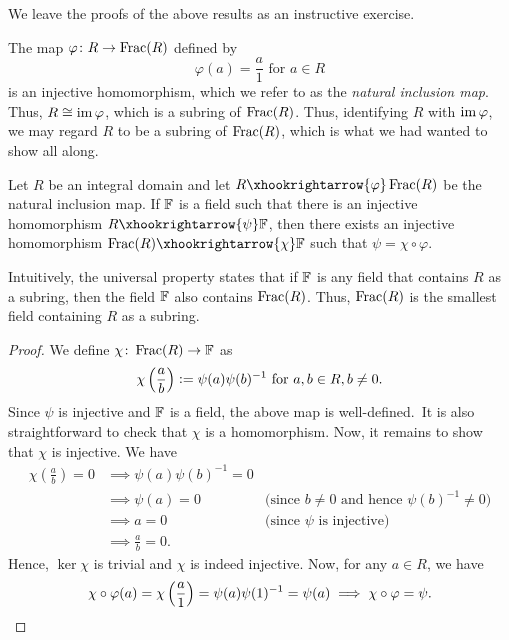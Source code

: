 We leave the proofs of the above results as an instructive exercise.

The map $\varphi \colon R \to \operatorname{Frac}(R)$ defined by
\[
    \varphi(a) = \frac{a}{1} \text{ for } a \in R
\]
is an injective homomorphism, which we refer to as the \emph{natural inclusion map}. Thus, $R \cong \operatorname{im}\varphi$, which is a subring of $\operatorname{Frac}(R)$. Thus, identifying $R$ with $\operatorname{im}\varphi$, we may regard $R$ to be a subring of $\operatorname{Frac}(R)$, which is what we had wanted to show all along.

\begin{theorem} \label{thm:universal-property} Let $R$ be an       integral domain and let $R \xhookrightarrow{\varphi} \fr(R)$ be the natural inclusion map. If $\mathbb{F}$ is a field such that there is an injective homomorphism $R \xhookrightarrow{\psi} \F$, then there exists an injective homomorphism $\fr(R) \xhookrightarrow{\chi} \F$ such that $\psi = \chi \circ \varphi$.
\end{theorem}


Intuitively, the universal property states that if $\mathbb{F}$ is any field that contains $R$ as a subring, then the field $\mathbb{F}$ also contains $\operatorname{Frac}(R)$. Thus, $\operatorname{Frac}(R)$ is the smallest field containing $R$ as a subring.

\begin{proof}
    We define $\chi \colon \operatorname{Frac}(R) \to \mathbb{F}$ as 
    \[
        \chi\left( \frac{a}{b} \right) \vcentcolon= \psi(a) \psi(b)^{-1} \text{ for } a,b \in R, b \neq 0.
    \]
    Since $\psi$ is injective and $\mathbb{F}$ is a field, the above map is well-defined.\footnotemark\ It is also straightforward to check that $\chi$ is a homomorphism. Now, it remains to show that $\chi$ is injective. We have
    \begin{align*}
        \chi\left( \frac{a}{b} \right) = 0 &\implies \psi(a)\psi(b)^{-1} = 0 \\
        &\implies \psi(a) = 0 &\text{(since $b \neq 0$ and hence $\psi(b)^{-1} \neq 0$)} \\
        &\implies a = 0 &\text{(since $\psi$ is injective)} \\
        &\implies \frac{a}{b} = 0.
    \end{align*}
    Hence, $\ker\chi$ is trivial and $\chi$ is indeed injective. Now, for any $a \in R$, we have
    \[
        \chi\circ\varphi(a) = \chi\left( \frac{a}{1} \right) = \psi(a)\psi(1)^{-1} = \psi(a) \implies \chi\circ\varphi = \psi.\qedhere
    \]
\end{proof}


